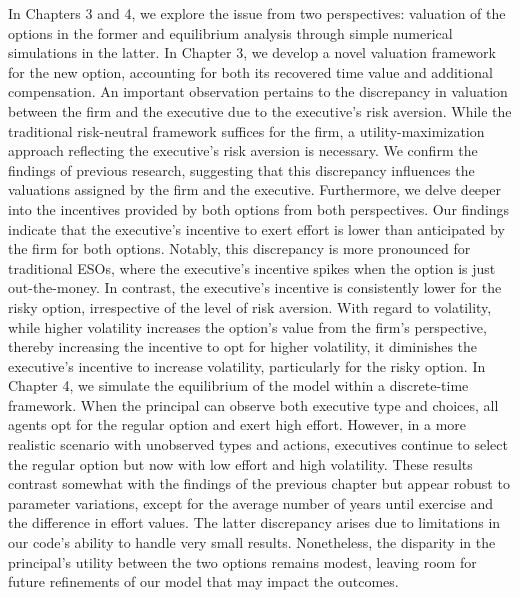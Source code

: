 In Chapters 3 and 4, we explore the issue from two perspectives: valuation of the options in the former and equilibrium analysis through simple numerical simulations in the latter. In Chapter 3, we develop a novel valuation framework for the new option, accounting for both its recovered time value and additional compensation. An important observation pertains to the discrepancy in valuation between the firm and the executive due to the executive's risk aversion. While the traditional risk-neutral framework suffices for the firm, a utility-maximization approach reflecting the executive's risk aversion is necessary. We confirm the findings of previous research, suggesting that this discrepancy influences the valuations assigned by the firm and the executive. Furthermore, we delve deeper into the incentives provided by both options from both perspectives. Our findings indicate that the executive's incentive to exert effort is lower than anticipated by the firm for both options. Notably, this discrepancy is more pronounced for traditional ESOs, where the executive's incentive spikes when the option is just out-the-money. In contrast, the executive's incentive is consistently lower for the risky option, irrespective of the level of risk aversion. With regard to volatility, while higher volatility increases the option's value from the firm's perspective, thereby increasing the incentive to opt for higher volatility, it diminishes the executive's incentive to increase volatility, particularly for the risky option.
In Chapter 4, we simulate the equilibrium of the model within a discrete-time framework. When the principal can observe both executive type and choices, all agents opt for the regular option and exert high effort. However, in a more realistic scenario with unobserved types and actions, executives continue to select the regular option but now with low effort and high volatility. These results contrast somewhat with the findings of the previous chapter but appear robust to parameter variations, except for the average number of years until exercise and the difference in effort values. The latter discrepancy arises due to limitations in our code's ability to handle very small results. Nonetheless, the disparity in the principal's utility between the two options remains modest, leaving room for future refinements of our model that may impact the outcomes.
